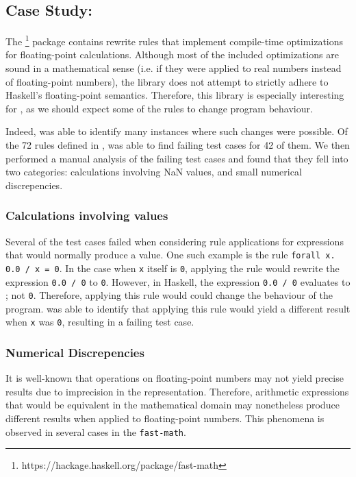 {\subsection{Case Study: \fastmath}

The \fastmath\footnote{https://hackage.haskell.org/package/fast-math} package
contains rewrite rules that implement compile-time optimizations for
floating-point calculations. Although most of the included optimizations are
sound in a mathematical sense (i.e. if they were applied to real numbers instead
of floating-point numbers), the library does not attempt to strictly adhere to
Haskell's floating-point semantics. Therefore, this library is especially
interesting for \Rulecheck, as we should expect some of the rules to change
program behaviour.

Indeed, \Rulecheck was able to identify many instances where such changes were
possible. Of the 72 rules defined in \fastmath, \Rulecheck was able to find
failing test cases for 42 of them. We then performed a manual analysis of the
failing test cases and found that they fell into two categories: calculations
involving NaN values, and small numerical discrepencies.

\subsubsection{Calculations involving \NaN values}

Several of the test cases failed when considering rule applications for
expressions that would normally produce a \NaN value. One such example is the
rule \texttt{forall x. 0.0 / x = 0}. In the case when \texttt{x} itself is
\texttt{0}, applying the rule would rewrite the expression \texttt{0.0 / 0} to
\texttt{0}. However, in Haskell, the expression \texttt{0.0 / 0} evaluates to
\NaN; not \texttt{0}. Therefore, applying this rule would could change the
behaviour of the program. \Rulecheck was able to identify that applying this
rule would yield a different result when \texttt{x} was \texttt{0}, resulting in
a failing test case.

\subsubsection{Numerical Discrepencies}

It is well-known that operations on floating-point numbers may not yield precise
results due to imprecision in the representation. Therefore, arithmetic
expressions that would be equivalent in the mathematical domain may nonetheless
produce different results when applied to floating-point numbers. This phenomena
is observed in several cases in the \texttt{fast-math}.

}
